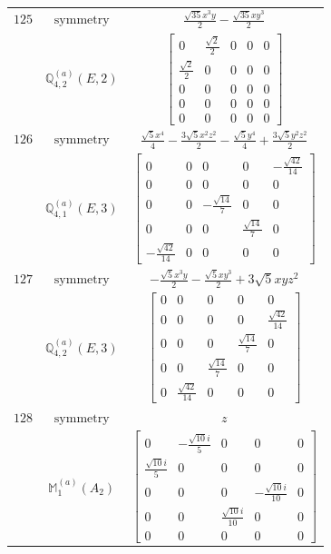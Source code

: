 \documentclass[fleqn,8pt,landscape]{jsarticle}
\begin{document}
\begin{longtable}{ccc}
$ 125 $ & $ \text{symmetry} $ & $ \frac{\sqrt{35} x^{3} y}{2} - \frac{\sqrt{35} x y^{3}}{2} $ \\
$  $ & $ \mathbb{Q}_{4,2}^{(a)}(E,2) $ & $ \begin{bmatrix} 0 & \frac{\sqrt{2}}{2} & 0 & 0 & 0 \\ \frac{\sqrt{2}}{2} & 0 & 0 & 0 & 0 \\ 0 & 0 & 0 & 0 & 0 \\ 0 & 0 & 0 & 0 & 0 \\ 0 & 0 & 0 & 0 & 0 \end{bmatrix} $ \\ \hline
$ 126 $ & $ \text{symmetry} $ & $ \frac{\sqrt{5} x^{4}}{4} - \frac{3 \sqrt{5} x^{2} z^{2}}{2} - \frac{\sqrt{5} y^{4}}{4} + \frac{3 \sqrt{5} y^{2} z^{2}}{2} $ \\
$  $ & $ \mathbb{Q}_{4,1}^{(a)}(E,3) $ & $ \begin{bmatrix} 0 & 0 & 0 & 0 & - \frac{\sqrt{42}}{14} \\ 0 & 0 & 0 & 0 & 0 \\ 0 & 0 & - \frac{\sqrt{14}}{7} & 0 & 0 \\ 0 & 0 & 0 & \frac{\sqrt{14}}{7} & 0 \\ - \frac{\sqrt{42}}{14} & 0 & 0 & 0 & 0 \end{bmatrix} $ \\ \hline
$ 127 $ & $ \text{symmetry} $ & $ - \frac{\sqrt{5} x^{3} y}{2} - \frac{\sqrt{5} x y^{3}}{2} + 3 \sqrt{5} x y z^{2} $ \\
$  $ & $ \mathbb{Q}_{4,2}^{(a)}(E,3) $ & $ \begin{bmatrix} 0 & 0 & 0 & 0 & 0 \\ 0 & 0 & 0 & 0 & \frac{\sqrt{42}}{14} \\ 0 & 0 & 0 & \frac{\sqrt{14}}{7} & 0 \\ 0 & 0 & \frac{\sqrt{14}}{7} & 0 & 0 \\ 0 & \frac{\sqrt{42}}{14} & 0 & 0 & 0 \end{bmatrix} $ \\ \hline
$ 128 $ & $ \text{symmetry} $ & $ z $ \\
$  $ & $ \mathbb{M}_{1}^{(a)}(A_{2}) $ & $ \begin{bmatrix} 0 & - \frac{\sqrt{10} i}{5} & 0 & 0 & 0 \\ \frac{\sqrt{10} i}{5} & 0 & 0 & 0 & 0 \\ 0 & 0 & 0 & - \frac{\sqrt{10} i}{10} & 0 \\ 0 & 0 & \frac{\sqrt{10} i}{10} & 0 & 0 \\ 0 & 0 & 0 & 0 & 0 \end{bmatrix} $ \\ \hline

\end{longtable}
\end{document}
